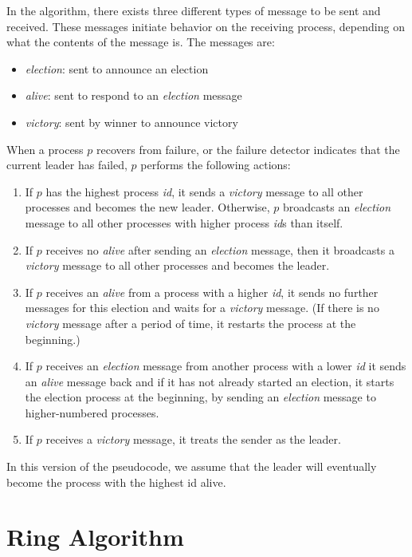 \documentclass{report}
\begin{document}
In the algorithm, there exists three different types of message to be sent and received. These messages initiate behavior on the receiving process, depending on what the contents of the message is. The messages are:
\begin{itemize}
  \item \textit{election}: sent to announce an election
  \item \textit{alive}: sent to respond to an \textit{election} message
  \item \textit{victory}: sent by winner to announce victory
\end{itemize}

When a process $p$ recovers from failure, or the failure detector indicates that the current leader has failed, $p$ performs the following actions:

\begin{enumerate}
\item If $p$ has the highest process \textit{id}, it sends a \textit{victory} message to all other processes and becomes the new leader. Otherwise, $p$ broadcasts an \textit{election} message to all other processes with higher process \textit{id}s than itself.
\item If $p$ receives no \textit{alive} after sending an \textit{election} message, then it broadcasts a \textit{victory} message to all other processes and becomes the leader.
\item If $p$ receives an \textit{alive} from a process with a higher \textit{id}, it sends no further messages for this election and waits for a \textit{victory} message. (If there is no \textit{victory} message after a period of time, it restarts the process at the beginning.)
\item If $p$ receives an \textit{election} message from another process with a lower \textit{id} it sends an \textit{alive} message back and if it has not already started an election, it starts the election process at the beginning, by sending an \textit{election} message to higher-numbered processes.
\item If $p$ receives a \textit{victory} message, it treats the sender as the leader.
\end{enumerate}

In this version of the pseudocode, we assume that the leader will eventually become the process with the highest id alive.

\section{Ring Algorithm}
\end{document}
